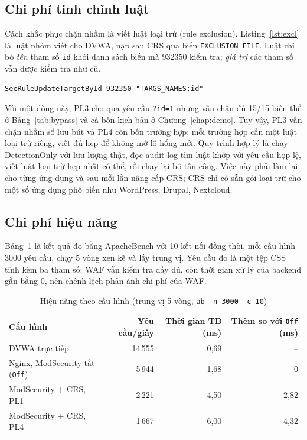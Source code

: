 \subsection{Chi phí tinh chỉnh luật}\label{sec:tinhchinh}
Cách khắc phục chặn nhầm là viết luật loại trừ (rule exclusion). Listing~\ref{lst:excl} là luật nhóm viết cho DVWA, nạp sau CRS qua biến \texttt{EXCLUSION\_FILE}. Luật chỉ bỏ \emph{tên} tham số \texttt{id} khỏi danh sách biến mà 932350 kiểm tra; \emph{giá trị} các tham số vẫn được kiểm tra như cũ.

\begin{lstlisting}[caption={Luật loại trừ cho DVWA (\texttt{lab/rules/dvwa-exclusions.conf})},label={lst:excl}]
SecRuleUpdateTargetById 932350 "!ARGS_NAMES:id"
\end{lstlisting}

Với một dòng này, PL3 cho qua yêu cầu \texttt{?id=1} nhưng vẫn chặn đủ 15/15 biến thể ở Bảng~\ref{tab:bypass} và cả bốn kịch bản ở Chương~\ref{chap:demo}. Tuy vậy, PL3 vẫn chặn nhầm sổ lưu bút và PL4 còn bốn trường hợp; mỗi trường hợp cần một luật loại trừ riêng, viết đủ hẹp để không mở lỗ hổng mới. Quy trình hợp lý là chạy DetectionOnly với lưu lượng thật, đọc audit log tìm luật khớp với yêu cầu hợp lệ, viết luật loại trừ hẹp nhất có thể, rồi chạy lại bộ tấn công. Việc này phải làm lại cho từng ứng dụng và sau mỗi lần nâng cấp CRS; CRS chỉ có sẵn gói loại trừ cho một số ứng dụng phổ biến như WordPress, Drupal, Nextcloud.

\subsection{Chi phí hiệu năng}
Bảng~\ref{tab:bench} là kết quả đo bằng ApacheBench với 10 kết nối đồng thời, mỗi cấu hình 3000 yêu cầu, chạy 5 vòng xen kẽ và lấy trung vị. Yêu cầu đo là một tệp CSS tĩnh kèm ba tham số: WAF vẫn kiểm tra đầy đủ, còn thời gian xử lý của backend gần bằng 0, nên chênh lệch phản ánh chi phí của WAF.

\begin{table}[!htb]
\centering
\caption{Hiệu năng theo cấu hình (trung vị 5 vòng, \texttt{ab -n 3000 -c 10})}
\label{tab:bench}
\footnotesize
\begin{tabular}{@{}lrrr@{}}
\toprule
\textbf{Cấu hình} & \textbf{Yêu cầu/giây} & \textbf{Thời gian TB (ms)} & \textbf{Thêm so với \texttt{Off} (ms)} \\ \midrule
DVWA trực tiếp & 14\,555 & 0,69 & -- \\
Nginx, ModSecurity tắt (\texttt{Off}) & 5\,944 & 1,68 & 0 \\
ModSecurity + CRS, PL1 & 2\,221 & 4,50 & 2,82 \\
ModSecurity + CRS, PL4 & 1\,667 & 6,00 & 4,32 \\
\bottomrule
\end{tabular}
\end{table}

